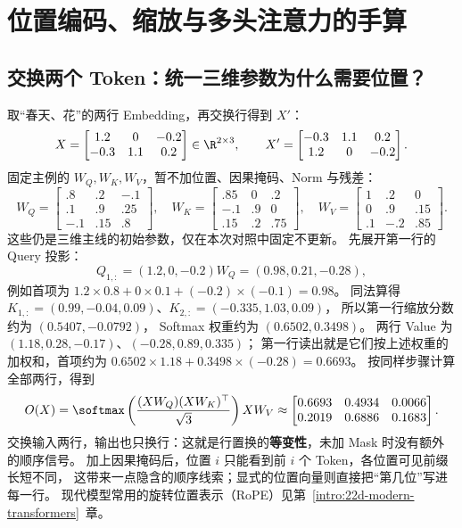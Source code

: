 \chapterrule
\section{位置编码、缩放与多头注意力的手算}
\label{intro:22a-position-multihead}

\begingroup
\setlength{\parskip}{2pt}
\setlength{\abovedisplayskip}{4pt}
\setlength{\belowdisplayskip}{4pt}
\setlength{\abovedisplayshortskip}{2pt}
\setlength{\belowdisplayshortskip}{2pt}
\subsection{交换两个 Token：统一三维参数为什么需要位置？}

取“春天、花”的两行 Embedding，再交换行得到 $X' $：
\[
X=\begin{bmatrix}1.2&0&-0.2\\-0.3&1.1&0.2\end{bmatrix}
\in\R^{2\times3},\qquad
X'=\begin{bmatrix}-0.3&1.1&0.2\\1.2&0&-0.2\end{bmatrix}.
\]
固定主例的 $W_Q,W_K,W_V$，暂不加位置、因果掩码、Norm 与残差：
\[
W_Q=\begin{bmatrix}.8&.2&-.1\\.1&.9&.25\\-.1&.15&.8\end{bmatrix},\quad
W_K=\begin{bmatrix}.85&0&.2\\-.1&.9&0\\.15&.2&.75\end{bmatrix},\quad
W_V=\begin{bmatrix}1&.2&0\\0&.9&.15\\.1&-.2&.85\end{bmatrix}.
\]
这些仍是三维主线的初始参数，仅在本次对照中固定不更新。
先展开第一行的 Query 投影：
\[
Q_{1,:}=(1.2,0,-0.2)W_Q=(0.98,0.21,-0.28),
\]
例如首项为 $1.2\times0.8+0\times0.1+(-0.2)\times(-0.1)=0.98$。
同法算得 $K_{1,:}=(0.99,-0.04,0.09)$、$K_{2,:}=(-0.335,1.03,0.09)$，
所以第一行缩放分数约为 $(0.5407,-0.0792)$，
Softmax 权重约为 $(0.6502,0.3498)$。
两行 Value 为 $(1.18,0.28,-0.17)$、$(-0.28,0.89,0.335)$；
第一行读出就是它们按上述权重的加权和，首项约为
$0.6502\times1.18+0.3498\times(-0.28)=0.6693$。
按同样步骤计算全部两行，得到
\[
O(X)=\softmax\left(\frac{(XW_Q)(XW_K)^\top}{\sqrt3}\right)XW_V
\approx\begin{bmatrix}
0.6693&0.4934&0.0066\\0.2019&0.6886&0.1683
\end{bmatrix}.
\]
交换输入两行，输出也只换行：这就是行置换的\textbf{等变性}，未加 Mask 时没有额外的顺序信号。
加上因果掩码后，位置 $i$ 只能看到前 $i$ 个 Token，各位置可见前缀长短不同，
这带来一点隐含的顺序线索；显式的位置向量则直接把“第几位”写进每一行。
现代模型常用的旋转位置表示（RoPE）见第~\ref*{intro:22d-modern-transformers}~章。

